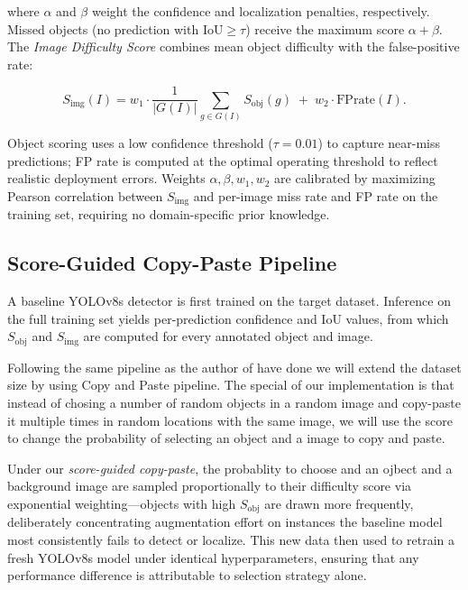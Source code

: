 \documentclass[conference]{IEEEtran}
\begin{document}
where $\alpha$ and $\beta$ weight the confidence and localization
penalties, respectively.
Missed objects (no prediction with $\mathrm{IoU} \ge \tau$) receive
the maximum score $\alpha{+}\beta$.
The \emph{Image Difficulty Score} combines mean object difficulty with
the false-positive rate:

\begin{equation}
S_{\mathrm{img}}(I)
  = w_1 \cdot \frac{1}{|G(I)|}
    \sum_{g\in G(I)} S_{\mathrm{obj}}(g)
  \;+\; w_2 \cdot \mathrm{FPrate}(I).
\label{eq:img}
\end{equation}

Object scoring uses a low confidence threshold ($\tau{=}0.01$)
to capture near-miss predictions; FP rate is computed at the
optimal operating threshold to reflect realistic deployment errors.
Weights $\alpha, \beta, w_1, w_2$ are calibrated by maximizing
Pearson correlation between $S_{\mathrm{img}}$ and per-image miss
rate and FP rate on the training set, requiring no domain-specific
prior knowledge.

\subsection{Score-Guided Copy-Paste Pipeline}

A baseline YOLOv8s detector is first trained on the target dataset.
Inference on the full training set yields per-prediction confidence
and IoU values, from which $S_{\mathrm{obj}}$ and $S_{\mathrm{img}}$
are computed for every annotated object and image.

Following the same pipeline as the author of \cite{kisantal2019augmentation} 
have done we will extend the dataset size 
by using Copy and Paste pipeline.
The special of our implementation is that instead of 
chosing a number of random objects in a random image and copy-paste it
multiple times in random locations with the same image,
we will use the score to change the probability of selecting an object 
and a image to copy and paste.

Under our \emph{score-guided copy-paste}, the probablity to choose and 
an ojbect and a background image are sampled
proportionally to their difficulty score via exponential
weighting---objects with high $S_{\mathrm{obj}}$ are drawn
more frequently, deliberately concentrating augmentation effort on
instances the baseline model most consistently fails to detect or
localize.
This new data then used to retrain a fresh YOLOv8s model
under identical hyperparameters, ensuring that any performance
difference is attributable to selection strategy alone.
\end{document}
